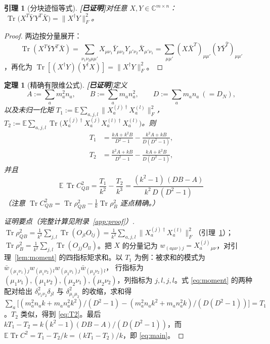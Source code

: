 \documentclass[11pt,a4paper]{ctexart}
\newtheorem{theorem}{定理}
\newtheorem{lemma}{引理}
\theoremstyle{definition}
\newcommand{\proved}{\textcolor{green!45!black}{\textbf{[已证明]}}}
\newcommand{\Tr}{\operatorname{Tr}}
\newcommand{\E}{\mathbb{E}}
\newcommand{\C}{\mathbb{C}}
\begin{document}
\begin{lemma}[分块迹恒等式]\proved{}\label{lem:trace}
对任意 $X,Y\in\C^{m\times n}$：$\ \Tr\!\big(X^T\bar Y\,Y^T\bar X\big)=\|X^\dagger Y\|_F^2$。
\end{lemma}
\begin{proof}
两边按分量展开：\[
\Tr(X^T\bar Y Y^T\bar X)=\sum_{\nu_1\nu_2\mu\mu'}X_{\mu\nu_1}\bar Y_{\mu\nu_2}Y_{\mu'\nu_2}\bar X_{\mu'\nu_1}
=\sum_{\mu\mu'}(X\bar X^T)_{\mu\mu'}\overline{(Y\bar Y^T)_{\mu\mu'}}
\]
，再化为 $\Tr[(X^\dagger Y)(Y^\dagger X)]=\|X^\dagger Y\|_F^2$。
\end{proof}

\begin{theorem}[精确有限维公式]\proved{}\label{thm:main}
定义
\[
A:=\sum_a m_a^2n_a,\qquad B:=\sum_a m_an_a^2,\qquad D:=\sum_am_an_a\ (=D_N),
\]
以及未归一化矩 $T_1:=\E\sum_{a,j,l}\|X_a^{(j)\dagger}X_a^{(l)}\|_F^2$，$T_2:=\E\sum_{a,j,l}\Tr\!\big(X_a^{(j)\dagger}X_a^{(j)}X_a^{(l)\dagger}X_a^{(l)}\big)$。则
\begin{align}
T_1&=\frac{kA+k^2B}{D^2-1}-\frac{k^2A+kB}{D(D^2-1)},\label{eq:T1}\\
T_2&=\frac{k^2A+kB}{D^2-1}-\frac{kA+k^2B}{D(D^2-1)},\label{eq:T2}
\end{align}
并且
\begin{equation}\label{eq:main}
\boxed{\ \E\,\Tr C_{QB}^2=\frac{T_1}{k^2}-\frac{T_2}{k^3}
=\frac{(k^2-1)\,(DB-A)}{k^2\,D\,(D^2-1)}\ }
\end{equation}
（注意 $\Tr C_{QB}^2=\Tr\rho_{QB}^2-\frac1k\Tr\rho_B^2$ 逐点精确。）
\end{theorem}
\begin{proof}[证明要点（完整计算见附录~\ref{app:proof}）]
$\Tr\rho_{QB}^2=\frac1{k^2}\sum_{j,l}\Tr(O_{jl}O_{lj})=\frac{1}{k^2}\sum_{a,j,l}\|X_a^{(j)\dagger}X_a^{(l)}\|_F^2$（引理~\ref{lem:trace}）；$\Tr\rho_B^2=\frac1{k^2}\sum_{j,l}\Tr(O_{jj}O_{ll})$。把 $X$ 的分量记为 $w_{(a\mu\nu)j}=X_a^{(j)}{}_{\mu\nu}$，对引理~\ref{lem:moment} 的四指标矩求和。以 $T_1$ 为例：被求和的模式为
$\bar w_{(\mu_1\nu_1)j}w_{(\mu_1\nu_2)l}w_{(\mu_2\nu_1)j}\bar w_{(\mu_2\nu_2)l}$，
行指标为 $(\mu_1\nu_1),(\mu_1\nu_2),(\mu_2\nu_1),(\mu_2\nu_2)$，列指标为 $j,l,j,l$。式 \eqref{eq:moment} 的两种配对给出 $\delta_{\nu_1\nu_2}^2\delta_{jl}$ 与 $\delta_{\mu_1\mu_2}^2$ 的收缩，求和得
$\sum_a\big[(m_a^2n_ak+m_an_a^2k^2)/(D^2-1)-(m_a^2n_ak^2+m_an_a^2k)/(D(D^2-1))\big]=T_1$。$T_2$ 类似，得到 \eqref{eq:T2}。最后 $kT_1-T_2=k(k^2-1)(DB-A)/(D(D^2-1))$，而 $\E\Tr C^2=T_1-T_2/k=(kT_1-T_2)/k$，即 \eqref{eq:main}。
\end{proof}
\end{document}
